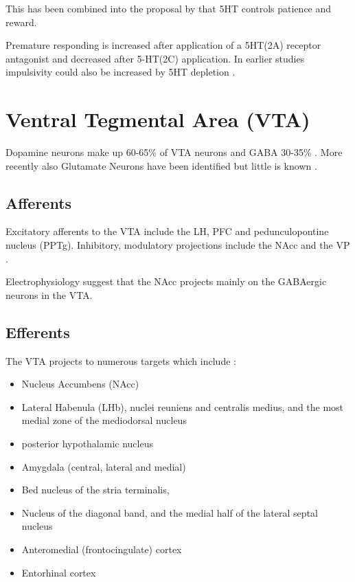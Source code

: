 \documentclass[12pt,a4paper]{article}
\begin{document}
This has been combined into the proposal by \citep{Miyazaki2012} that
5HT controls patience and reward.

Premature responding is increased after \citep{Fletcher2007}
application of a 5HT(2A) receptor antagonist and decreased after
5-HT(2C) application. In earlier studies impulsivity could also be
increased by 5HT depletion \citep{Harrison1997}.










\section{Ventral Tegmental Area (VTA)}
Dopamine neurons make up 60-65\% of VTA neurons and GABA 30-35\%
\citep{Sesack2010}. More recently also Glutamate Neurons have been
identified but little is known \citep{Morales2017}.


\subsection{Afferents}
Excitatory afferents to the VTA include the LH, PFC and pedunculopontine nucleus
(PPTg). Inhibitory, modulatory projections include the NAcc and the VP \citep{Sesack2010}.

Electrophysiology suggest that the NAcc projects mainly on the GABAergic neurons in the VTA.

\subsection{Efferents}

The VTA projects to numerous targets which include \citep{Beckstead1979}:
\begin{itemize}
  \item Nucleus Accumbens (NAcc)
  \item Lateral Habenula (LHb), nuclei reuniens and centralis medius, and the most medial zone of the mediodorsal nucleus 
  \item posterior hypothalamic nucleus 
  \item Amygdala (central, lateral and medial)
  \item Bed nucleus of the stria terminalis, 
  \item Nucleus of the diagonal band, and the medial half of the lateral septal nucleus
  \item Anteromedial (frontocingulate) cortex
  \item Entorhinal cortex
\end{itemize}
\end{document}
